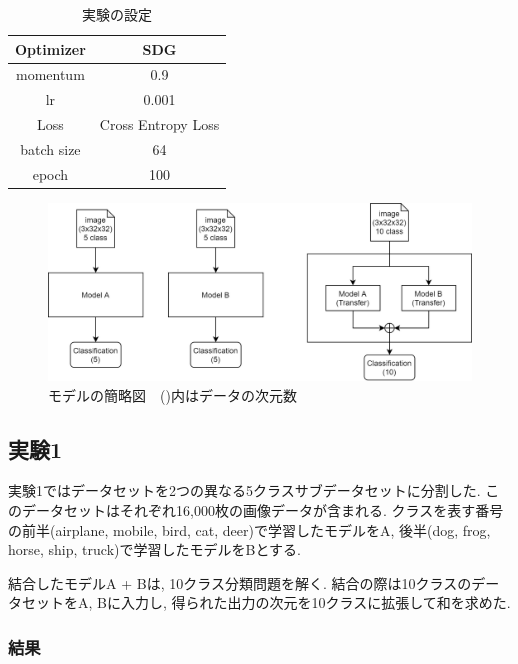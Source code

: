\documentclass[twocolumn]{jarticle}     %
\begin{document}
\begin{table}[tb]
  \begin{center}
    \caption{実験の設定}
    \begin{tabular}{|c|c|} \hline
      Optimizer & SDG \\ \hline
      momentum & 0.9 \\ \hline
      lr & 0.001 \\ \hline
      Loss & Cross Entropy Loss \\ \hline
      batch size & 64 \\ \hline
      epoch & 100 \\ \hline
    \end{tabular}
    \label{tab:setting}
  \end{center}
\end{table}

\begin{figure}[t]
	\begin{center}
		\includegraphics[clip,width=16cm]{model_figure.png}
		\caption{モデルの簡略図　()内はデータの次元数}
		\label{fig:model}
	\end{center}
\end{figure}

\subsection{実験1}

実験1ではデータセットを2つの異なる5クラスサブデータセットに分割した.
このデータセットはそれぞれ16,000枚の画像データが含まれる.
クラスを表す番号の前半(airplane, mobile, bird, cat, deer)で学習したモデルをA,
後半(dog, frog, horse, ship, truck)で学習したモデルをBとする.

結合したモデルA + Bは, 10クラス分類問題を解く.
結合の際は10クラスのデータセットをA, Bに入力し, 得られた出力の次元を10クラスに拡張して和を求めた.

\subsubsection{結果}
\end{document}
